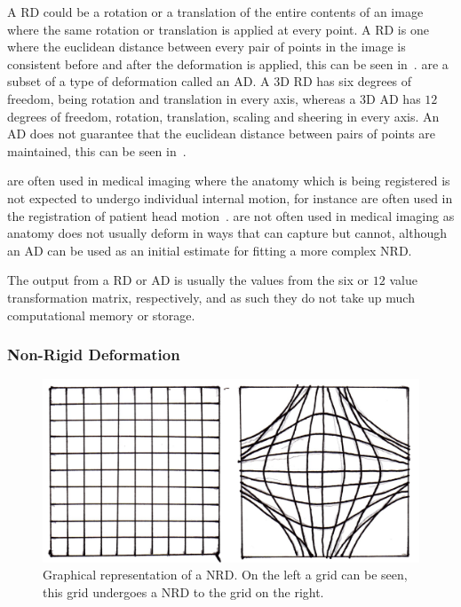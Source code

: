                 A \gls{RD} could be a rotation or a translation of the entire contents of an image where the same rotation or translation is applied at every point. A \gls{RD} is one where the euclidean distance between every pair of points in the image is consistent before and after the deformation is applied, this can be seen in~.  are a subset of a type of deformation called an \gls{AD}. A \gls{3D} \gls{RD} has six degrees of freedom, being rotation and translation in every axis, whereas a \gls{3D} \gls{AD} has $12$ degrees of freedom, rotation, translation, scaling and sheering in every axis. An \gls{AD} does not guarantee that the euclidean distance between pairs of points are maintained, this can be seen in~.
                
                 are often used in medical imaging where the anatomy which is being registered is not expected to undergo individual internal motion, for instance  are often used in the registration of patient head motion~\parencite{Hill2001}.  are not often used in medical imaging as anatomy does not usually deform in ways that  can capture but  cannot, although an \gls{AD} can be used as an initial estimate for fitting a more complex \gls{NRD}.
                
                The output from a \gls{RD} or \gls{AD} is usually the values from the six or $12$ value transformation matrix, respectively, and as such they do not take up much computational memory or storage.
                
            \subsubsection{Non-Rigid Deformation} \label{sec:non_rigid_deformation}
                \begin{figure}
                    \centering
                    
                    \includegraphics[width=1.0\linewidth]{figures/background_nrd.png}
                    
                    \captionsetup{singlelinecheck=false, justification=raggedright}
                    \caption{Graphical representation of a \gls{NRD}. On the left a grid can be seen, this grid undergoes a \gls{NRD} to the grid on the right.} \label{fig:non_rigid_deformation_nrd}
                \end{figure}
                
